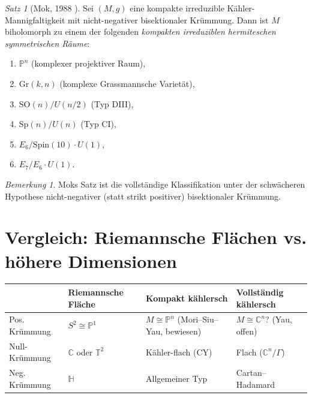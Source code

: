 \documentclass[12pt,a4paper]{amsart}
\theoremstyle{definition}
\theoremstyle{remark}
\newtheorem{satz}[theorem]{Satz}
\newtheorem{bemerkung}[theorem]{Bemerkung}
\newcommand{\CC}{\mathbb{C}}
\newcommand{\PP}{\mathbb{P}}
\newcommand{\TT}{\mathbb{T}}
\begin{document}
\begin{satz}[Mok, 1988 \cite{Mok1988}]
\label{satz:mok}
Sei $(M, g)$ eine kompakte irreduzible Kähler-Mannigfaltigkeit mit
nicht-negativer bisektionaler Krümmung.  Dann ist $M$ biholomorph zu
einem der folgenden \emph{kompakten irreduziblen hermiteschen symmetrischen Räume}:
\begin{enumerate}[label=(\roman*)]
  \item $\PP^n$ (komplexer projektiver Raum),
  \item $\mathrm{Gr}(k,n)$ (komplexe Grassmannsche Varietät),
  \item $\mathrm{SO}(n)/U(n/2)$ (Typ DIII),
  \item $\mathrm{Sp}(n)/U(n)$ (Typ CI),
  \item $E_6/\mathrm{Spin}(10)\cdot U(1)$,
  \item $E_7/E_6 \cdot U(1)$.
\end{enumerate}
\end{satz}

\begin{bemerkung}
Moks Satz ist die vollständige Klassifikation unter der schwächeren Hypothese
nicht-negativer (statt strikt positiver) bisektionaler Krümmung.
\end{bemerkung}

\section{Vergleich: Riemannsche Flächen vs. höhere Dimensionen}

\begin{center}
\begin{tabular}{p{2.8cm}p{3.5cm}p{3.5cm}p{3.5cm}}
\toprule
 & Riemannsche Fläche & Kompakt kählersch & Vollständig kählersch \\
\midrule
Pos. Krümmung & $S^2 \cong \PP^1$ & $M \cong \PP^n$ (Mori--Siu--Yau, bewiesen) & $M \cong \CC^n$? (Yau, offen) \\[4pt]
Null-Krümmung & $\CC$ oder $\TT^2$ & Kähler-flach (CY) & Flach ($\CC^n/\Gamma$) \\[4pt]
Neg. Krümmung & $\mathbb{H}$ & Allgemeiner Typ & Cartan--Hadamard \\
\bottomrule
\end{tabular}
\end{center}

\end{document}
